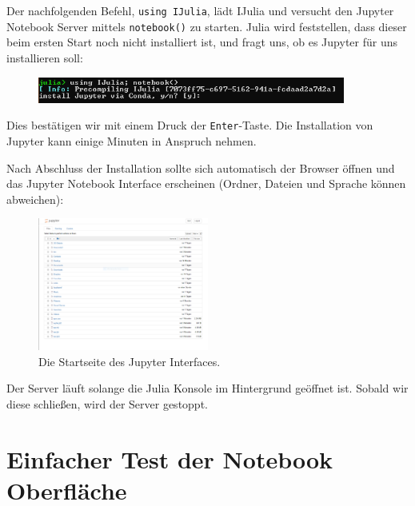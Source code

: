 \documentclass[11pt, a4paper]{scrartcl}
\begin{document}
	Der nachfolgenden Befehl, \texttt{using IJulia}, lädt IJulia und versucht den Jupyter Notebook Server mittels \texttt{notebook()} zu starten. Julia wird feststellen, dass dieser beim ersten Start noch nicht installiert ist, und fragt uns, ob es Jupyter für uns installieren soll:
	
	\begin{figure}[h!]
	\centering
	\includegraphics[width=0.9\textwidth]{imgs/Jupyter_install.png}
	\end{figure}
	
	Dies bestätigen wir mit einem Druck der \texttt{Enter}-Taste. Die Installation von Jupyter kann einige Minuten in Anspruch nehmen.
	
	Nach Abschluss der Installation sollte sich automatisch der Browser öffnen und das Jupyter Notebook Interface erscheinen (Ordner, Dateien und Sprache können abweichen):
	
	\begin{figure}[h!]
	\centering
	\includegraphics[width=0.5\textwidth]{imgs/jupyter.png}
	\caption{Die Startseite des Jupyter Interfaces. \label{fig:jupyter}}
	\end{figure}
	
	Der Server läuft solange die Julia Konsole im Hintergrund geöffnet ist. Sobald wir diese schließen, wird der Server gestoppt.
	
	
	
	
	
	
	
	
	
	
	
	
	
	\newpage
	\section{Einfacher Test der Notebook Oberfläche}
	
\end{document}
